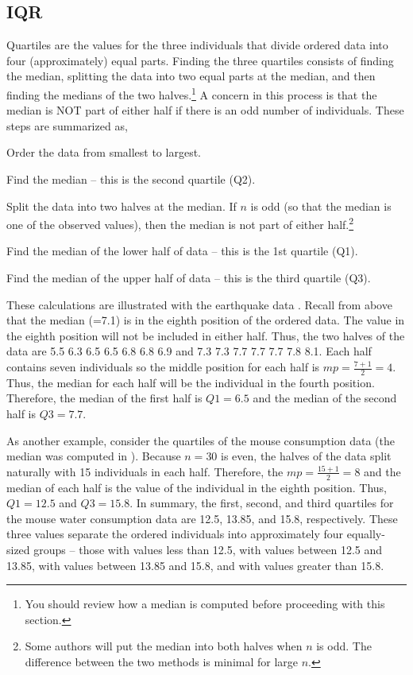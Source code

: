 \documentclass[10pt,openany]{book}\usepackage[]{graphicx}\usepackage[]{color}
\begin{document}
\subsection{IQR}
Quartiles are the values for the three individuals that divide ordered data into four (approximately) equal parts.  Finding the three quartiles consists of finding the median, splitting the data into two equal parts at the median, and then finding the medians of the two halves.\footnote{You should review how a median is computed before proceeding with this section.}  A concern in this process is that the median is NOT part of either half if there is an odd number of individuals.  These steps are summarized as,
\begin{Enumerate}
  \item Order the data from smallest to largest.
  \item Find the median -- this is the second quartile (Q2).
  \item Split the data into two halves at the median.  If $n$ is odd (so that the median is one of the observed values), then the median is not part of either half.\footnote{Some authors will put the median into both halves when $n$ is odd.  The difference between the two methods is minimal for large $n$.}
  \item Find the median of the lower half of data -- this is the 1st quartile (Q1).
  \item Find the median of the upper half of data -- this is the third quartile (Q3).
\end{Enumerate}

These calculations are illustrated with the earthquake data .  Recall from above  that the median (=7.1) is in the eighth position of the ordered data.  The value in the eighth position will not be included in either half.  Thus, the two halves of the data are 5.5 6.3 6.5 6.5 6.8 6.8 6.9 and 7.3 7.3 7.7 7.7 7.7 7.8 8.1.  Each half contains seven individuals so the middle position for each half is $mp=\frac{7+1}{2}=4$.  Thus, the median for each half will be the individual in the fourth position.  Therefore, the median of the first half is $Q1=6.5$ and the median of the second half is $Q3=7.7$.

As another example, consider the quartiles of the mouse consumption data (the median was computed in ).  Because $n=30$ is even, the halves of the data split naturally with 15 individuals in each half.  Therefore, the $mp=\frac{15+1}{2}=8$ and the median of each half is the value of the individual in the eighth position.  Thus, $Q1=12.5$ and $Q3=15.8$.  In summary, the first, second, and third quartiles for the mouse water consumption data are 12.5, 13.85, and 15.8, respectively.  These three values separate the ordered individuals into approximately four equally-sized groups -- those with values less than 12.5, with values between 12.5 and 13.85, with values between 13.85 and 15.8, and with values greater than 15.8.
\end{document}
